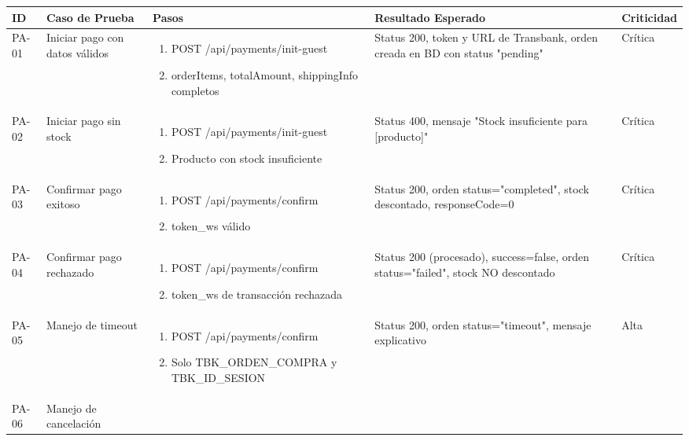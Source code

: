 \documentclass[12pt,a4paper]{article}
\begin{document}
\begin{longtable}{|p{1cm}|p{3cm}|p{4cm}|p{3cm}|p{3cm}|}
\hline
\textbf{ID} & \textbf{Caso de Prueba} & \textbf{Pasos} & \textbf{Resultado Esperado} & \textbf{Criticidad} \\
\hline
\endfirsthead
PA-01 & Iniciar pago con datos válidos &
\begin{enumerate}[leftmargin=*,nosep]
    \item POST /api/payments/init-guest
    \item orderItems, totalAmount, shippingInfo completos
\end{enumerate} &
Status 200, token y URL de Transbank, orden creada en BD con status "pending" & Crítica \\
\hline
PA-02 & Iniciar pago sin stock &
\begin{enumerate}[leftmargin=*,nosep]
    \item POST /api/payments/init-guest
    \item Producto con stock insuficiente
\end{enumerate} &
Status 400, mensaje "Stock insuficiente para [producto]" & Crítica \\
\hline
PA-03 & Confirmar pago exitoso &
\begin{enumerate}[leftmargin=*,nosep]
    \item POST /api/payments/confirm
    \item token\_ws válido
\end{enumerate} &
Status 200, orden status="completed", stock descontado, responseCode=0 & Crítica \\
\hline
PA-04 & Confirmar pago rechazado &
\begin{enumerate}[leftmargin=*,nosep]
    \item POST /api/payments/confirm
    \item token\_ws de transacción rechazada
\end{enumerate} &
Status 200 (procesado), success=false, orden status="failed", stock NO descontado & Crítica \\
\hline
PA-05 & Manejo de timeout &
\begin{enumerate}[leftmargin=*,nosep]
    \item POST /api/payments/confirm
    \item Solo TBK\_ORDEN\_COMPRA y TBK\_ID\_SESION
\end{enumerate} &
Status 200, orden status="timeout", mensaje explicativo & Alta \\
\hline
PA-06 & Manejo de cancelación &

\end{longtable}
\end{document}
